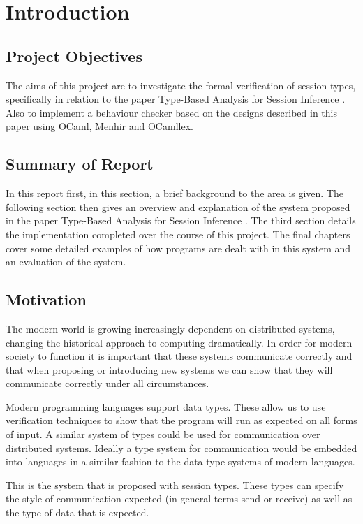 \chapter{Introduction}

\section{Project Objectives}
The aims of this project are to investigate the formal verification of session types, specifically in relation to the paper Type-Based Analysis for Session Inference \cite{paper1}. Also to implement a behaviour checker based on the designs described in this paper using OCaml, Menhir and OCamllex. 

\section{Summary of Report}
In this report first, in this section, a brief background to the area is given. The following section then gives an overview and explanation of the system proposed in the paper Type-Based Analysis for Session Inference \cite{paper1}. The third section details the implementation completed over the course of this project. The final chapters cover some detailed examples of how programs are dealt with in this system and an evaluation of the system.

\section{Motivation}
The modern world is growing increasingly dependent on distributed systems, changing the historical approach to computing dramatically. In order for modern society to function it is important that these systems communicate correctly and that when proposing or introducing new systems we can show that they will communicate correctly under all circumstances. 

Modern programming languages support data types. These allow us to use verification techniques to show that the program will run as expected on all forms of input. A similar system of types could be used for communication over distributed systems. Ideally a type system for communication would be embedded into languages in a similar fashion to the data type systems of modern languages.

This is the system that is proposed with session types. These types can specify the style of communication expected (in general terms send or receive) as well as the type of data that is expected.  

